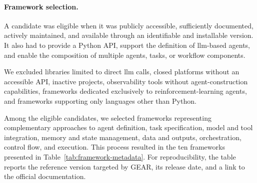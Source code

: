 \paragraph{\textbf{Framework selection.}}
A candidate was eligible when it was publicly accessible, sufficiently
documented, actively maintained, and available through an identifiable and
installable version. It also had to provide a Python API, support the definition
of \gls{llm}-based agents, and enable the composition of multiple agents, tasks,
or workflow components.

We excluded libraries limited to direct \gls{llm} calls, closed platforms
without an accessible API, inactive projects, observability tools without
agent-construction capabilities, frameworks dedicated exclusively to
reinforcement-learning agents, and frameworks supporting only languages other
than Python.

Among the eligible candidates, we selected frameworks representing
complementary approaches to agent definition, task specification, model and
tool integration, memory and state management, data and outputs, orchestration,
control flow, and execution. This process resulted in the ten frameworks
presented in Table~\ref{tab:framework-metadata}. For reproducibility, the table
reports the reference version targeted by GEAR, its release date, and a link to
the official documentation.

